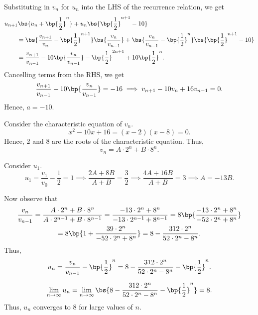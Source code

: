 \begin{solution}
    \begin{ppart}
        Substituting in $v_n$ for $u_n$ into the LHS of the recurrence relation, we get
        \begin{align*}
            &u_{n+1} \bs{u_n + \bp{\frac12}^n} + u_n \bs{\bp{\frac12}^{n+1} - 10}\\
            &\hspace{2em}= \bs{\frac{v_{n+1}}{v_n} - \bp{\frac12}^{n+1}} \bs{\frac{v_n}{v_{n-1}}} + \bs{\frac{v_n}{v_{n-1}} - \bp{\frac12}^n} \bs{\bp{\frac12}^{n+1} - 10}\\
            &\hspace{2em}= \frac{v_{n+1}}{v_{n-1}} - 10 \bp{\frac{v_n}{v_{n-1}}} - \bp{\frac12}^{2n+1} + 10\bp{\frac12}^n.
        \end{align*}
        Cancelling terms from the RHS, we get \[\frac{v_{n+1}}{v_{n-1}} -10 \bp{\frac{v_n}{v_{n-1}}} = -16 \implies v_{n+1} - 10v_n + 16v_{n-1} = 0.\] Hence, $a = -10$.
    \end{ppart}
    \begin{ppart}
        Consider the characteristic equation of $v_n$. \[x^2 - 10x + 16 = (x-2)(x-8) = 0.\] Hence, 2 and 8 are the roots of the characteristic equation. Thus, \[v_n = A \cdot 2^n + B \cdot 8^n.\]

        Consider $u_1$. \[u_1 = \frac{v_1}{v_0} - \frac12 = 1 \implies  \frac{2A + 8B}{A + B} = \frac32 \implies \frac{4A + 16B}{A + B} = 3 \implies A = -13B.\]
        
        Now observe that
        \begin{gather*}
            \frac{v_n}{v_{n-1}} = \frac{A \cdot 2^n + B \cdot 8^n}{A \cdot 2^{n-1} + B \cdot 8^{n-1}} = \frac{-13 \cdot 2^n + 8^n}{-13 \cdot 2^{n-1} + 8^{n-1}} = 8\bp{\frac{-13 \cdot 2^n + 8^n}{-52 \cdot 2^n + 8^n}} \\
            = 8\bp{1 + \frac{39 \cdot 2^n}{-52 \cdot 2^n +  8^n}} = 8 - \frac{312 \cdot 2^n}{52 \cdot 2^n - 8^n}.
        \end{gather*}
        Thus, \[u_n = \frac{v_n}{v_{n-1}} - \bp{\frac12}^n = 8 - \frac{312 \cdot 2^n}{52 \cdot 2^n - 8^n} - \bp{\frac12}^n.\]
    \end{ppart}
    \begin{ppart}
        \[\lim_{n \to \infty} u_n = \lim_{n \to \infty} \bs{8 - \frac{312 \cdot 2^n}{52 \cdot 2^n - 8^n} - \bp{\frac12}^n} = 8.\] Thus, $u_n$ converges to 8 for large values of $n$.
    \end{ppart}
\end{solution}